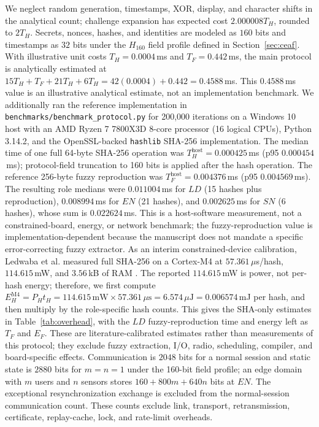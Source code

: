 \documentclass[cmc,article,submit,moreauthors,pdftex]{Definitions/tsp}
\begin{document}
We neglect random generation, timestamps, XOR, display, and character shifts in the analytical count; challenge expansion has expected cost $2.000008T_H$, rounded to $2T_H$. Secrets, nonces, hashes, and identities are modeled as $160$ bits and timestamps as $32$ bits under the $H_{160}$ field profile defined in Section~\ref{sec:ceaf}. With illustrative unit costs $T_H=0.0004$\,ms and $T_F=0.442$\,ms, the main protocol is analytically estimated at $15T_H+T_F+21T_H+6T_H=42(0.0004)+0.442=0.4588$\,ms. This $0.4588$\,ms value is an illustrative analytical estimate, not an implementation benchmark. We additionally ran the reference implementation in \texttt{benchmarks/benchmark\_protocol.py} for 200,000 iterations on a Windows 10 host with an AMD Ryzen 7 7800X3D 8-core processor (16 logical CPUs), Python 3.14.2, and the OpenSSL-backed \texttt{hashlib} SHA-256 implementation. The median time of one full 64-byte SHA-256 operation was $T_H^{\mathrm{host}}=0.000425$\,ms (p95 $0.000454$\,ms); protocol-field truncation to 160 bits is applied after the hash operation. The reference 256-byte fuzzy reproduction was $T_F^{\mathrm{host}}=0.004376$\,ms (p95 $0.004569$\,ms). The resulting role medians were $0.011004$\,ms for $LD$ (15 hashes plus reproduction), $0.008994$\,ms for $EN$ (21 hashes), and $0.002625$\,ms for $SN$ (6 hashes), whose sum is $0.022624$\,ms. This is a host-software measurement, not a constrained-board, energy, or network benchmark; the fuzzy-reproduction value is implementation-dependent because the manuscript does not mandate a specific error-correcting fuzzy extractor. As an interim constrained-device calibration, Ledwaba et al. measured full SHA-256 on a Cortex-M4 at $57.361$\,$\mu$s/hash, $114.615$\,mW, and $3.56$\,kB of RAM \cite{ledwaba2018cortex}. The reported $114.615$\,mW is power, not per-hash energy; therefore, we first compute $E_H^{\mathrm{M4}}=P_H t_H=114.615\,\mathrm{mW}\times57.361\,\mu\mathrm{s}=6.574\,\mu\mathrm{J}=0.006574$\,mJ per hash, and then multiply by the role-specific hash counts. This gives the SHA-only estimates in Table~\ref{tab:overhead}, with the $LD$ fuzzy-reproduction time and energy left as $T_F$ and $E_F$. These are literature-calibrated estimates rather than measurements of this protocol; they exclude fuzzy extraction, I/O, radio, scheduling, compiler, and board-specific effects. Communication is $2048$ bits for a normal session and static state is $2880$ bits for $m=n=1$ under the 160-bit field profile; an edge domain with $m$ users and $n$ sensors stores $160+800m+640n$ bits at $EN$. The exceptional resynchronization exchange is excluded from the normal-session communication count. These counts exclude link, transport, retransmission, certificate, replay-cache, lock, and rate-limit overheads.
\end{document}
